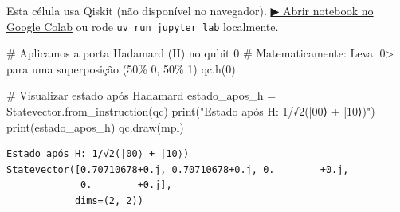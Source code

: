 \documentclass[
  brazilian,
]{report}
\newenvironment{Shaded}{\begin{snugshade}}{\end{snugshade}}
\newcommand{\BuiltInTok}[1]{\textcolor[rgb]{0.00,0.23,0.31}{#1}}
\newcommand{\CommentTok}[1]{\textcolor[rgb]{0.37,0.37,0.37}{#1}}
\newcommand{\DecValTok}[1]{\textcolor[rgb]{0.68,0.00,0.00}{#1}}
\newcommand{\NormalTok}[1]{\textcolor[rgb]{0.00,0.23,0.31}{#1}}
\newcommand{\OperatorTok}[1]{\textcolor[rgb]{0.37,0.37,0.37}{#1}}
\newcommand{\StringTok}[1]{\textcolor[rgb]{0.13,0.47,0.30}{#1}}
\begin{document}
\begin{tcolorbox}[enhanced jigsaw, arc=.35mm, bottomrule=.15mm, bottomtitle=1mm, breakable, colback=white, colbacktitle=quarto-callout-warning-color!10!white, colframe=quarto-callout-warning-color-frame, coltitle=black, left=2mm, leftrule=.75mm, opacityback=0, opacitybacktitle=0.6, rightrule=.15mm, title=\textcolor{quarto-callout-warning-color}{\faExclamationTriangle}\hspace{0.5em}{⚛️ Célula Qiskit --- execute no Colab ou localmente}, titlerule=0mm, toprule=.15mm, toptitle=1mm]

Esta célula usa Qiskit (não disponível no navegador).
\href{https://colab.research.google.com/github/maxwellamaral/aula-quantum/blob/main/notebooks/01-intro.ipynb}{▶
Abrir notebook no Google Colab} ou rode \texttt{uv\ run\ jupyter\ lab}
localmente.

\begin{Shaded}
\begin{Highlighting}[]

\CommentTok{\# Aplicamos a porta Hadamard (H) no qubit 0}
\CommentTok{\# Matematicamente: Leva |0\textgreater{} para uma superposição (50\% 0, 50\% 1)}
\NormalTok{qc.h(}\DecValTok{0}\NormalTok{)}

\CommentTok{\# Visualizar estado após Hadamard}
\NormalTok{estado\_apos\_h }\OperatorTok{=}\NormalTok{ Statevector.from\_instruction(qc)}
\BuiltInTok{print}\NormalTok{(}\StringTok{"Estado após H: 1/√2(|00⟩ + |10⟩)"}\NormalTok{)}
\BuiltInTok{print}\NormalTok{(estado\_apos\_h)}
\NormalTok{qc.draw(}\StringTok{\textquotesingle{}mpl\textquotesingle{}}\NormalTok{)}
\end{Highlighting}
\end{Shaded}

\end{tcolorbox}

\begin{verbatim}
Estado após H: 1/√2(|00⟩ + |10⟩)
Statevector([0.70710678+0.j, 0.70710678+0.j, 0.        +0.j,
             0.        +0.j],
            dims=(2, 2))
\end{verbatim}
\end{document}
